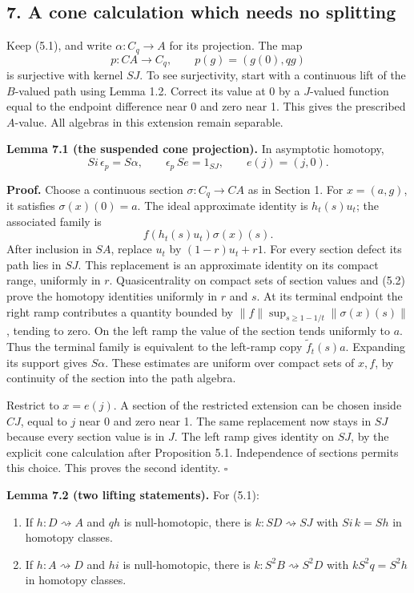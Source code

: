 \documentclass[
  11pt,
]{article}
\providecommand{\tightlist}{%
  \setlength{\itemsep}{0pt}\setlength{\parskip}{0pt}}
\begin{document}
\subsection{7. A cone calculation which needs no
splitting}\label{a-cone-calculation-which-needs-no-splitting}

Keep (5.1), and write \(\alpha:C_q\to A\) for its projection. The map \[
p:CA\longrightarrow C_q,\qquad
p(g)=(g(0),qg)
\tag{7.1}
\] is surjective with kernel \(SJ\). To see surjectivity, start with a
continuous lift of the \(B\)-valued path using Lemma 1.2. Correct its
value at 0 by a \(J\)-valued function equal to the endpoint difference
near 0 and zero near 1. This gives the prescribed \(A\)-value. All
algebras in this extension remain separable.

\textbf{Lemma 7.1 (the suspended cone projection).} In asymptotic
homotopy, \[
Si\,\epsilon_p=S\alpha,
\qquad
\epsilon_p\,Se=1_{SJ},\qquad e(j)=(j,0).
\tag{7.2}
\]

\textbf{Proof.} Choose a continuous section \(\sigma:C_q\to CA\) as in
Section 1. For \(x=(a,g)\), it satisfies \(\sigma(x)(0)=a\). The ideal
approximate identity is \(h_t(s)u_t\); the associated family is \[
f(h_t(s)u_t)\sigma(x)(s).
\tag{7.3}
\] After inclusion in \(SA\), replace \(u_t\) by \((1-r)u_t+r1\). For
every section defect its path lies in \(SJ\). This replacement is an
approximate identity on its compact range, uniformly in \(r\).
Quasicentrality on compact sets of section values and (5.2) prove the
homotopy identities uniformly in \(r\) and \(s\). At its terminal
endpoint the right ramp contributes a quantity bounded by
\(\|f\|\sup_{s\geq1-1/t}\|\sigma(x)(s)\|\), tending to zero. On the left
ramp the value of the section tends uniformly to \(a\). Thus the
terminal family is equivalent to the left-ramp copy
\(\widetilde f_t(s)a\). Expanding its support gives \(S\alpha\). These
estimates are uniform over compact sets of \(x,f\), by continuity of the
section into the path algebra.

Restrict to \(x=e(j)\). A section of the restricted extension can be
chosen inside \(CJ\), equal to \(j\) near 0 and zero near 1. The same
replacement now stays in \(SJ\) because every section value is in \(J\).
The left ramp gives identity on \(SJ\), by the explicit cone calculation
after Proposition 5.1. Independence of sections permits this choice.
This proves the second identity. \(\square\)

\textbf{Lemma 7.2 (two lifting statements).} For (5.1):

\begin{enumerate}
\def\labelenumi{\arabic{enumi}.}
\tightlist
\item
  If \(h:D \rightsquigarrow A\) and \(qh\) is null-homotopic, there is
  \(k:SD \rightsquigarrow SJ\) with \(Si\,k=Sh\) in homotopy classes.
\item
  If \(h:A \rightsquigarrow D\) and \(hi\) is null-homotopic, there is
  \(k:S^2B \rightsquigarrow S^2D\) with \(kS^2q=S^2h\) in homotopy
  classes.
\end{enumerate}
\end{document}

